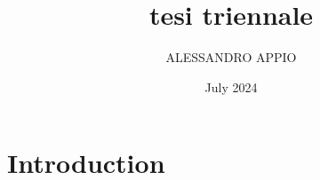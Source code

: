 \documentclass{article}
\title{tesi triennale}
\author{ALESSANDRO APPIO}
\date{July 2024}
\begin{document}
\maketitle

\section{Introduction}
\end{document}

